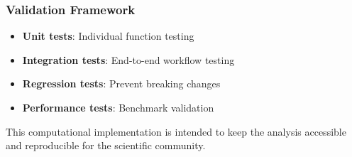 \subsubsection{Validation Framework}
\begin{itemize}
    \item \textbf{Unit tests}: Individual function testing
    \item \textbf{Integration tests}: End-to-end workflow testing
    \item \textbf{Regression tests}: Prevent breaking changes
    \item \textbf{Performance tests}: Benchmark validation
\end{itemize}

This computational implementation is intended to keep the analysis accessible and reproducible for the scientific community.
